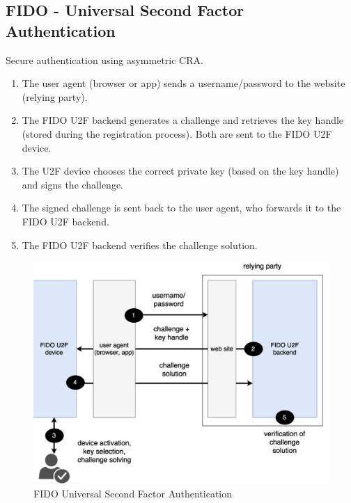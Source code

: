 \subsection*{FIDO - Universal Second Factor Authentication}
\begin{center}
    Secure authentication using asymmetric CRA.
\end{center}

\begin{multicols}{2}

\begin{enumerate}
    \item The user agent (browser or app) sends a username/password to the website (relying party).
    \item The FIDO U2F backend generates a challenge and retrieves the key handle (stored during the registration process). Both are sent to the FIDO U2F device.
    \item The U2F device chooses the correct private key (based on the key handle) and signs the challenge. 
    \item The signed challenge is sent back to the user agent, who forwards it to the FIDO U2F backend.
    \item The FIDO U2F backend verifies the challenge solution.
\end{enumerate}

\columnbreak

    \begin{figure}[H]
        \centering
        \includegraphics[width=\linewidth]{Images/Authentication/fidoauthn.png}
        \caption{FIDO Universal Second Factor Authentication}
    \end{figure}
\end{multicols}

